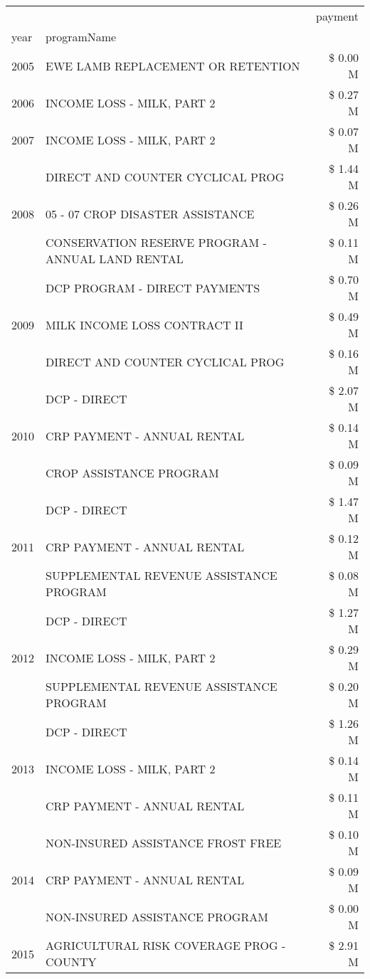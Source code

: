 \begin{tabular}{llr}
\toprule
 &  & payment \\
year & programName &  \\
\midrule
2005 & EWE LAMB REPLACEMENT OR RETENTION & \$ 0.00 M \\
\cline{1-3}
2006 & INCOME LOSS - MILK, PART 2 & \$ 0.27 M \\
\cline{1-3}
2007 & INCOME LOSS - MILK, PART 2 & \$ 0.07 M \\
\cline{1-3}
\multirow[t]{3}{*}{2008} & DIRECT AND COUNTER CYCLICAL PROG & \$ 1.44 M \\
 & 05 - 07 CROP DISASTER ASSISTANCE & \$ 0.26 M \\
 & CONSERVATION RESERVE PROGRAM - ANNUAL LAND RENTAL & \$ 0.11 M \\
\cline{1-3}
\multirow[t]{3}{*}{2009} & DCP PROGRAM - DIRECT PAYMENTS & \$ 0.70 M \\
 & MILK INCOME LOSS CONTRACT II & \$ 0.49 M \\
 & DIRECT AND COUNTER CYCLICAL PROG & \$ 0.16 M \\
\cline{1-3}
\multirow[t]{3}{*}{2010} & DCP - DIRECT & \$ 2.07 M \\
 & CRP PAYMENT - ANNUAL RENTAL & \$ 0.14 M \\
 & CROP ASSISTANCE PROGRAM & \$ 0.09 M \\
\cline{1-3}
\multirow[t]{3}{*}{2011} & DCP - DIRECT & \$ 1.47 M \\
 & CRP PAYMENT - ANNUAL RENTAL & \$ 0.12 M \\
 & SUPPLEMENTAL REVENUE ASSISTANCE PROGRAM & \$ 0.08 M \\
\cline{1-3}
\multirow[t]{3}{*}{2012} & DCP - DIRECT & \$ 1.27 M \\
 & INCOME LOSS - MILK, PART 2 & \$ 0.29 M \\
 & SUPPLEMENTAL REVENUE ASSISTANCE PROGRAM & \$ 0.20 M \\
\cline{1-3}
\multirow[t]{3}{*}{2013} & DCP - DIRECT & \$ 1.26 M \\
 & INCOME LOSS - MILK, PART 2 & \$ 0.14 M \\
 & CRP PAYMENT - ANNUAL RENTAL & \$ 0.11 M \\
\cline{1-3}
\multirow[t]{3}{*}{2014} & NON-INSURED ASSISTANCE FROST FREE & \$ 0.10 M \\
 & CRP PAYMENT - ANNUAL RENTAL & \$ 0.09 M \\
 & NON-INSURED ASSISTANCE PROGRAM & \$ 0.00 M \\
\cline{1-3}
\multirow[t]{3}{*}{2015} & AGRICULTURAL RISK COVERAGE PROG - COUNTY & \$ 2.91 M \\

\end{tabular}
